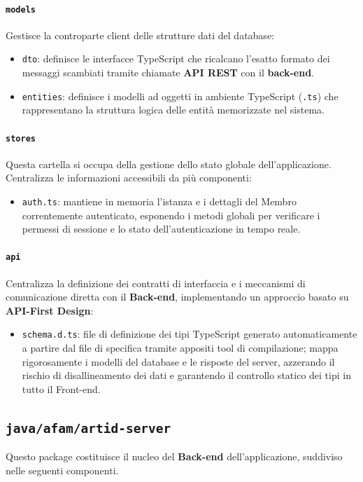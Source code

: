 \paragraph{\texttt{models}}
Gestisce la controparte client delle strutture dati del database:
\begin{itemize}
    \item \texttt{dto}: definisce le interfacce TypeScript che ricalcano l'esatto formato dei messaggi scambiati tramite chiamate \textbf{API REST} con il \textbf{back-end}.
    \item \texttt{entities}: definisce i modelli ad oggetti in ambiente TypeScript (\texttt{.ts}) che rappresentano la struttura logica delle entità memorizzate nel sistema.
\end{itemize}

\paragraph{\texttt{stores}}
Questa cartella si occupa della gestione dello stato globale dell'applicazione.\\ Centralizza le informazioni accessibili da più componenti:
\begin{itemize}
    \item \texttt{auth.ts}: mantiene in memoria l'istanza e i dettagli del Membro correntemente autenticato, esponendo i metodi globali per verificare i permessi di sessione e lo stato dell'autenticazione in tempo reale.
\end{itemize}

\paragraph{\texttt{api}}
Centralizza la definizione dei contratti di interfaccia e i meccanismi di comunicazione diretta con il \textbf{Back-end}, implementando un approccio basato su \textbf{API-First Design}:
\begin{itemize}
    \item \texttt{schema.d.ts}: file di definizione dei tipi TypeScript generato automaticamente a partire dal file di specifica tramite appositi tool di compilazione; mappa rigorosamente i modelli del database e le risposte del server, azzerando il rischio di disallineamento dei dati e garantendo il controllo statico dei tipi in tutto il Front-end.
\end{itemize}

\subsection{\texttt{java/afam/artid-server}}
Questo package costituisce il nucleo del \textbf{Back-end} dell'applicazione, suddiviso nelle seguenti componenti.

